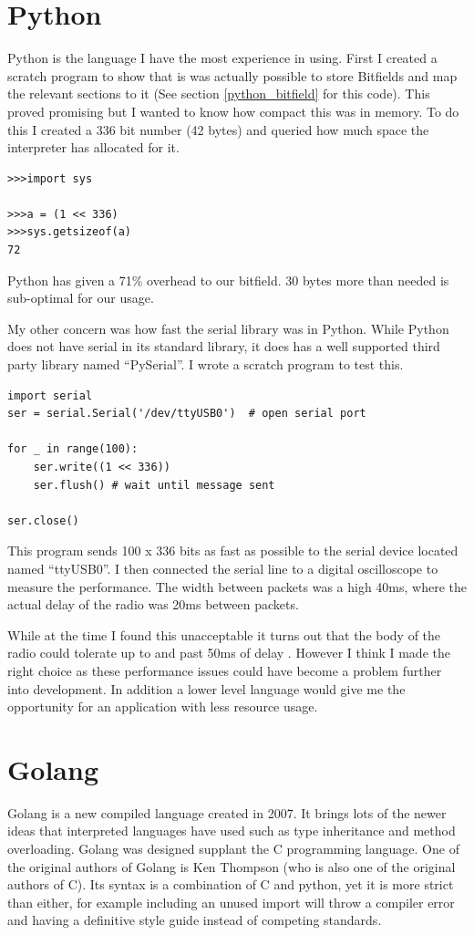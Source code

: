 \section*{Python}
Python is the language I have the most experience in using. First I created a scratch program to show that is was actually possible to store Bitfields and map the relevant sections to it (See section \ref{python_bitfield} for this code). This proved promising but I wanted to know how compact this was in memory. To do this I created a 336 bit number (42 bytes) and queried how much space the interpreter has allocated for it. 

\begin{verbatim}
>>>import sys

>>>a = (1 << 336)
>>>sys.getsizeof(a)
72
\end{verbatim}

Python has given a 71\% overhead to our bitfield. 30 bytes more than needed is sub-optimal for our usage.

My other concern was how fast the serial library was in Python. While Python does not have serial in its standard library, it does has a well supported third party library named ``PySerial''\cite{pyserial}. I wrote a scratch program to test this.

\begin{verbatim}
import serial
ser = serial.Serial('/dev/ttyUSB0')  # open serial port

for _ in range(100):
    ser.write((1 << 336))
    ser.flush() # wait until message sent

ser.close()  
\end{verbatim}

This program sends 100 x 336 bits as fast as possible to the serial device located named ``ttyUSB0''. I then connected the serial line to a digital oscilloscope to measure the performance. The width between packets was a high 40ms, where the actual delay of the radio was 20ms between packets.

While at the time I found this unacceptable it turns out that the body of the radio could tolerate up to and past 50ms of delay . However I think I made the right choice as these performance issues could have become a problem further into development. In addition a lower level language would give me the opportunity for an application with less resource usage.

\section*{Golang}
Golang is a new compiled language created in 2007. It brings lots of the newer ideas that interpreted languages have used such as type inheritance and method overloading. Golang was designed supplant the C programming language. One of the original authors of Golang is Ken Thompson (who is also one of the original authors of C). Its syntax is a combination of C and python, yet it is more strict than either, for example including an unused import will throw a compiler error and  having a definitive style guide instead of competing standards.

